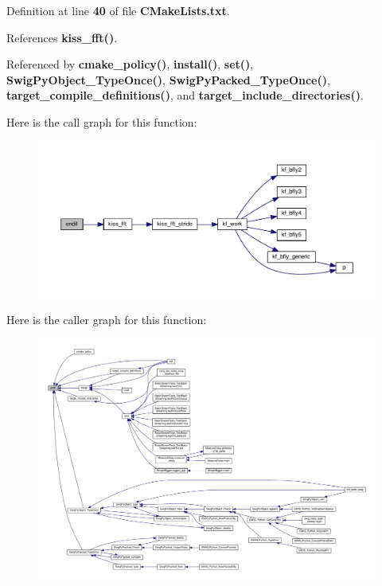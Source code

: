 Definition at line {\bf 40} of file {\bf C\+Make\+Lists.\+txt}.



References {\bf kiss\+\_\+fft()}.



Referenced by {\bf cmake\+\_\+policy()}, {\bf install()}, {\bf set()}, {\bf Swig\+Py\+Object\+\_\+\+Type\+Once()}, {\bf Swig\+Py\+Packed\+\_\+\+Type\+Once()}, {\bf target\+\_\+compile\+\_\+definitions()}, and {\bf target\+\_\+include\+\_\+directories()}.



Here is the call graph for this function\+:
\nopagebreak
\begin{figure}[H]
\begin{center}
\leavevmode
\includegraphics[width=350pt]{d9/dda/limesuite-dev_2src_2CMakeLists_8txt_a69654e14809bcd80e936600cffe6ed56_cgraph}
\end{center}
\end{figure}




Here is the caller graph for this function\+:
\nopagebreak
\begin{figure}[H]
\begin{center}
\leavevmode
\includegraphics[width=350pt]{d9/dda/limesuite-dev_2src_2CMakeLists_8txt_a69654e14809bcd80e936600cffe6ed56_icgraph}
\end{center}
\end{figure}


